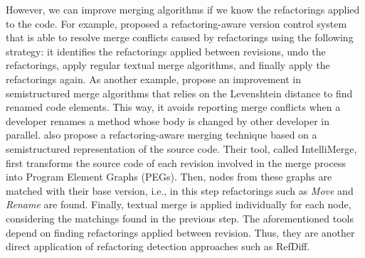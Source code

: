 However, we can improve merging algorithms if we know the refactorings applied to the code.
For example, \cite{dig2008effective} proposed a refactoring-aware version control system that is able to resolve merge conflicts caused by refactorings using the following strategy: it identifies the refactorings applied between revisions, undo the refactorings, apply regular textual merge algorithms, and finally apply the refactorings again.
As another example, \cite{cavalcanti2017evaluating} propose an improvement in semistructured merge algorithms that relies on the Levenshtein distance to find renamed code elements. This way, it avoids reporting merge conflicts when a developer renames a method whose body is changed by other developer in parallel.
\cite{shen2019intellimerge} also propose a refactoring-aware merging technique based on a semistructured representation of the source code.
Their tool, called IntelliMerge, first transforms the source code of each revision involved in the merge process into Program Element Graphs (PEGs).
Then, nodes from these graphs are matched with their base version, i.e., in this step refactorings such as \emph{Move} and \emph{Rename} are found.
Finally, textual merge is applied individually for each node, considering the matchings found in the previous step.
The aforementioned tools depend on finding refactorings applied between revision. Thus, they are another direct application of refactoring detection approaches such as RefDiff.


